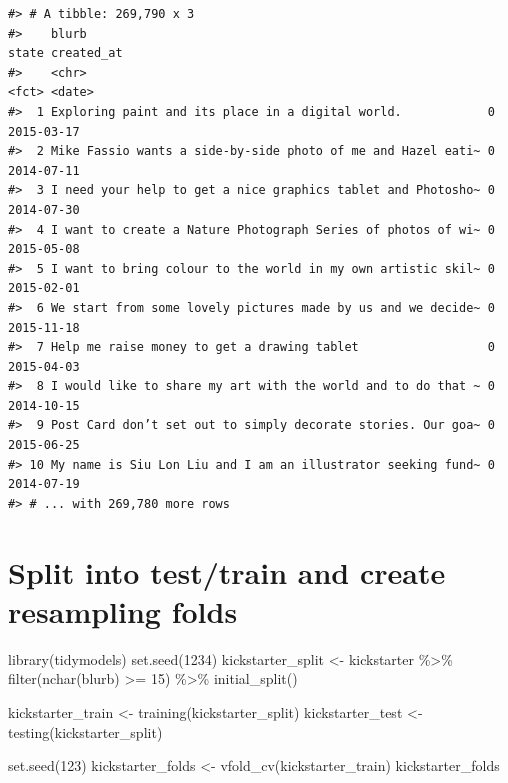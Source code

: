 \documentclass[
]{krantz}
\makeatletter
\newenvironment{Shaded}{\begin{snugshade}}{\end{snugshade}}
\newcommand{\DecValTok}[1]{\textcolor[rgb]{0.00,0.00,0.81}{#1}}
\newcommand{\FunctionTok}[1]{\textcolor[rgb]{0.00,0.00,0.00}{#1}}
\newcommand{\NormalTok}[1]{#1}
\newcommand{\OtherTok}[1]{\textcolor[rgb]{0.56,0.35,0.01}{#1}}
\newcommand{\SpecialCharTok}[1]{\textcolor[rgb]{0.00,0.00,0.00}{#1}}
\newenvironment{kframe}{%
\medskip{}
\setlength{\fboxsep}{.8em}
 \def\at@end@of@kframe{}%
 \ifinner\ifhmode%
  \def\at@end@of@kframe{\end{minipage}}%
  \begin{minipage}{\columnwidth}%
 \fi\fi%
 \def\FrameCommand##1{\hskip\@totalleftmargin \hskip-\fboxsep
 \colorbox{shadecolor}{##1}\hskip-\fboxsep
     \hskip-\linewidth \hskip-\@totalleftmargin \hskip\columnwidth}%
 \MakeFramed {\advance\hsize-\width
   \@totalleftmargin\z@ \linewidth\hsize
   \@setminipage}}%
 {\par\unskip\endMakeFramed%
 \at@end@of@kframe}
\renewenvironment{Shaded}{\begin{kframe}}{\end{kframe}}
\makeatother
\begin{document}
\begin{verbatim}
#> # A tibble: 269,790 x 3
#>    blurb                                                        state created_at
#>    <chr>                                                        <fct> <date>    
#>  1 Exploring paint and its place in a digital world.            0     2015-03-17
#>  2 Mike Fassio wants a side-by-side photo of me and Hazel eati~ 0     2014-07-11
#>  3 I need your help to get a nice graphics tablet and Photosho~ 0     2014-07-30
#>  4 I want to create a Nature Photograph Series of photos of wi~ 0     2015-05-08
#>  5 I want to bring colour to the world in my own artistic skil~ 0     2015-02-01
#>  6 We start from some lovely pictures made by us and we decide~ 0     2015-11-18
#>  7 Help me raise money to get a drawing tablet                  0     2015-04-03
#>  8 I would like to share my art with the world and to do that ~ 0     2014-10-15
#>  9 Post Card don’t set out to simply decorate stories. Our goa~ 0     2015-06-25
#> 10 My name is Siu Lon Liu and I am an illustrator seeking fund~ 0     2014-07-19
#> # ... with 269,780 more rows
\end{verbatim}

\hypertarget{split-into-testtrain-and-create-resampling-folds}{%
\section{Split into test/train and create resampling folds}\label{split-into-testtrain-and-create-resampling-folds}}

\begin{Shaded}
\begin{Highlighting}[]
\FunctionTok{library}\NormalTok{(tidymodels)}
\FunctionTok{set.seed}\NormalTok{(}\DecValTok{1234}\NormalTok{)}
\NormalTok{kickstarter\_split }\OtherTok{\textless{}{-}}\NormalTok{ kickstarter }\SpecialCharTok{\%\textgreater{}\%}
  \FunctionTok{filter}\NormalTok{(}\FunctionTok{nchar}\NormalTok{(blurb) }\SpecialCharTok{\textgreater{}=} \DecValTok{15}\NormalTok{) }\SpecialCharTok{\%\textgreater{}\%}
  \FunctionTok{initial\_split}\NormalTok{()}

\NormalTok{kickstarter\_train }\OtherTok{\textless{}{-}} \FunctionTok{training}\NormalTok{(kickstarter\_split)}
\NormalTok{kickstarter\_test }\OtherTok{\textless{}{-}} \FunctionTok{testing}\NormalTok{(kickstarter\_split)}

\FunctionTok{set.seed}\NormalTok{(}\DecValTok{123}\NormalTok{)}
\NormalTok{kickstarter\_folds }\OtherTok{\textless{}{-}} \FunctionTok{vfold\_cv}\NormalTok{(kickstarter\_train)}
\NormalTok{kickstarter\_folds}
\end{Highlighting}
\end{Shaded}
\end{document}
